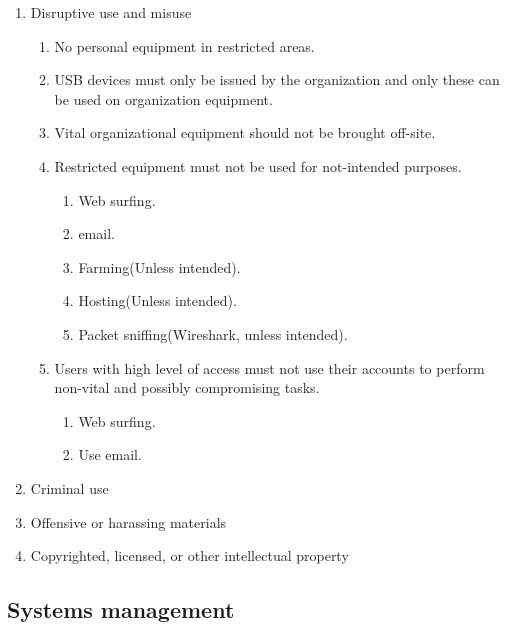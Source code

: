 \begin{enumerate}
  \item Disruptive use and misuse
  \begin{enumerate}
    \item No personal equipment in restricted areas.
    \item USB devices must only be issued by the organization and only these can be used on organization equipment.
    \item Vital organizational equipment should not be brought off-site.
    \item Restricted equipment must not be used for not-intended purposes.
    \begin{enumerate}
      \item Web surfing.
      \item email.
      \item Farming(Unless intended).
      \item Hosting(Unless intended).
      \item Packet sniffing(Wireshark, unless intended).
    \end{enumerate}
    \item Users with high level of access must not use their accounts to perform non-vital and possibly compromising tasks.
    \begin{enumerate}
        \item Web surfing.
        \item Use email.
    \end{enumerate}
  \end{enumerate}
  \item Criminal use
  \item Offensive or harassing materials
  \item Copyrighted, licensed, or other intellectual property
\end{enumerate}

\subsection{Systems management}

